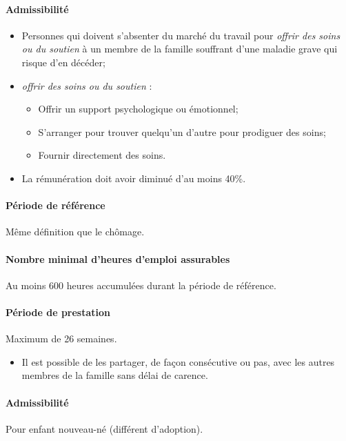 \documentclass[10pt, french]{article}
\begin{document}
\begin{multicols*}{3}
\begin{definitionNOHFILL}
\paragraph{Admissibilité}
\begin{itemize}[leftmargin = *]
	\item	Personnes qui doivent s'absenter du marché du travail pour \og \textit{offrir des soins ou du soutien}\fg{} à un membre de la famille souffrant d'une maladie grave qui risque d'en décéder;
	\item	\og \textit{offrir des soins ou du soutien} \fg{}:
		\begin{itemize}[leftmargin = *]
		\item	Offrir un support psychologique ou émotionnel;
		\item	S'arranger pour trouver quelqu'un d'autre pour prodiguer des soins;
		\item	Fournir directement des soins.
		\end{itemize}
	\item	La rémunération doit avoir diminué d'au moins 40\%.
\end{itemize}

\paragraph{Période de référence}
Même définition que le chômage.

\paragraph{Nombre minimal d'heures d'emploi assurables}
Au moins 600 heures accumulées durant la période de référence.

\paragraph{Période de prestation}
Maximum de 26 semaines.
\begin{itemize}[leftmargin = *]
	\item	Il est possible de les partager, de façon consécutive ou pas, avec les autres membres de la famille sans délai de carence.
\end{itemize}
\end{definitionNOHFILL}

\begin{definitionNOHFILL}
\paragraph{Admissibilité}
Pour enfant nouveau-né (différent d'adoption).


\end{definitionNOHFILL}
\end{multicols*}
\end{document}
